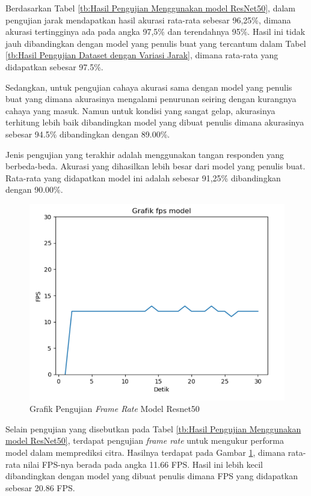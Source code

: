 Berdasarkan Tabel \ref{tb:Hasil Pengujian Menggunakan model ResNet50}, dalam pengujian jarak mendapatkan hasil akurasi rata-rata sebesar 96,25\%, dimana akurasi tertingginya ada pada angka 97,5\% dan terendahnya 95\%. Hasil ini tidak jauh dibandingkan dengan model yang penulis buat yang tercantum dalam Tabel \ref{tb:Hasil Pengujian Dataset dengan Variasi Jarak}, dimana rata-rata yang didapatkan sebesar 97.5\%.

Sedangkan, untuk pengujian cahaya akurasi sama dengan model yang penulis buat yang dimana akurasinya mengalami penurunan seiring dengan kurangnya cahaya yang masuk. Namun untuk kondisi yang sangat gelap, akurasinya terhitung lebih baik dibandingkan model yang dibuat penulis dimana akurasinya sebesar 94.5\% dibandingkan dengan 89.00\%.

Jenis pengujian yang terakhir adalah menggunakan tangan responden yang berbeda-beda. Akurasi yang dihasilkan lebih besar dari model yang penulis buat. Rata-rata yang didapatkan model ini adalah sebesar 91,25\% dibandingkan dengan 90.00\%.

\begin{figure}[!htb]
  \centering
  \includegraphics[scale=0.74]{gambar/pengujian-fps/grafik-pengujian-fps-resnet.png}
  \caption{Grafik Pengujian \emph{Frame Rate} Model Resnet50}
  \label{fig:Grafik Pengujian Frame Rate Model Resnet50}
\end{figure}

Selain pengujian yang disebutkan pada Tabel \ref{tb:Hasil Pengujian Menggunakan model ResNet50}, terdapat pengujian \emph{frame rate} untuk mengukur performa model dalam memprediksi citra. Hasilnya terdapat pada Gambar \ref{fig:Grafik Pengujian Frame Rate Model Resnet50}, dimana rata-rata nilai FPS-nya berada pada angka 11.66 FPS. Hasil ini lebih kecil dibandingkan dengan model yang dibuat penulis dimana FPS yang didapatkan sebesar 20.86 FPS. 

